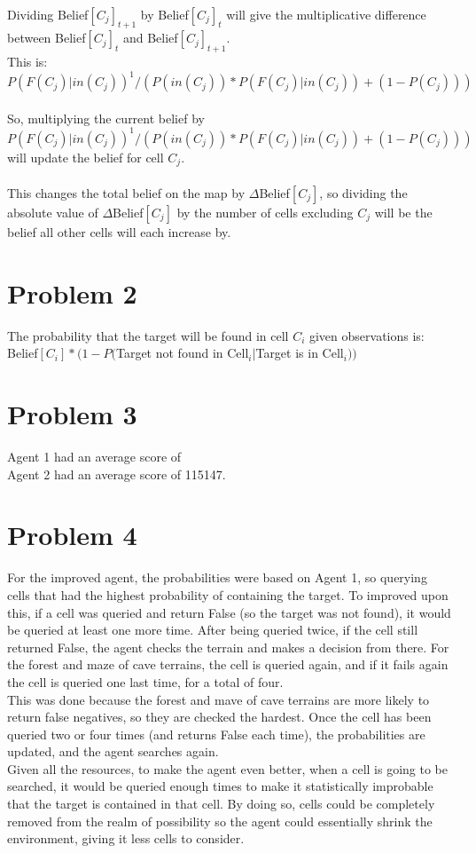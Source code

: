 \documentclass[12pt]{report}
\begin{document}
\\
Dividing Belief$[C_{j}]_{t+1}$ by Belief$[C_{j}]_{t}$ will give the multiplicative difference between Belief$[C_{j}]_{t}$ and Belief$[C_{j}]_{t+1}$.\\
This is: $P(F(C_{j})|in(C_{j}))^{1}/(P(in(C_{j}))*P(F(C_{j})|in(C_{j}))+(1-P(C_{j})))$\\
\\
So, multiplying the current belief by $P(F(C_{j})|in(C_{j}))^{1}/(P(in(C_{j}))*P(F(C_{j})|in(C_{j}))+(1-P(C_{j})))$ will update the belief for cell $C_{j}$.\\
\\
This changes the total belief on the map by $\Delta$Belief$[C_{j}]$, so dividing the absolute value of $\Delta$Belief$[C_{j}]$ by the number of cells excluding $C_{j}$ will be the belief all other cells will each increase by.

\section{Problem 2}
The probability that the target will be found in cell $C_{i}$ given observations is:\\
Belief$[C_{i}]*(1-P($Target not found in Cell$_{i}|$Target is in Cell$_{i}))$

\section{Problem 3}
Agent 1 had an average score of \\
Agent 2 had an average score of 115147.

\section{Problem 4}
For the improved agent, the probabilities were based on Agent 1, so querying cells that had the highest probability of containing the target. To improved upon this, if a cell was queried and return False (so the target was not found), it would be queried at least one more time. After being queried twice, if the cell still returned False, the agent checks the terrain and makes a decision from there. For the forest and maze of cave terrains, the cell is queried again, and if it fails again the cell is queried one last time, for a total of four. \\
This was done because the forest and mave of cave terrains are more likely to return false negatives, so they are checked the hardest. Once the cell has been queried two or four times (and returns False each time), the probabilities are updated, and the agent searches again. \\
Given all the resources, to make the agent even better, when a cell is going to be searched, it would be queried enough times to make it statistically improbable that the target is contained in that cell. By doing so, cells could be completely removed from the realm of possibility so the agent could essentially shrink the environment, giving it less cells to consider.
\end{document}
